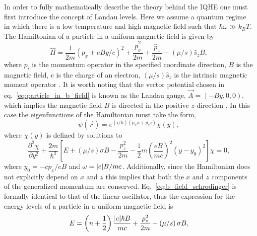\noindent In order to fully mathematically describe the theory behind the \acs{IQHE} one must first introduce the concept of Landau levels. Here we assume a quantum regime in which there is a low temperature and high magnetic field such that $\hbar\omega\gg k_B T$. The Hamiltonian of a particle in a uniform magnetic field is given by 
\begin{equation}\label{eq:particle_in_b_field}
\hat{H} = \frac{1}{2m}\left(\hat{p}_x+eBy/c\right)^2 + \frac{\hat{p}_y^2}{2m} + \frac{\hat{p}_z}{2m} - \left(\mu/s\right)\hat{s}_z B,
\end{equation}
where $\hat{p}_i$ is the momentum operator in the specified coordinate direction, $B$ is the magnetic field, $e$ is the charge of an electron, $\left(\mu/s\right)\hat{s}_z$ is the intrinsic magnetic moment operator \cite{Landau_Quantum1965}. It is worth noting that the vector potential chosen in eq.~\ref{eq:particle_in_b_field} is known as the Landau gauge, $\vec{A} = \left(-By, 0, 0\right)$, which implies the magnetic field $B$ is directed in the positive $z$-direction \cite{Sakurai_Quantum1994,Landau_Diagmagnetismus1930}. In this case the eigenfunctions of the Hamiltonian must take the form,
\begin{equation}\label{eq:psi_b_field}
\psi\left(\vec{r}\right) = e^{\left(i/\hbar\right)\left(p_x x+p_z z\right)}\chi\left(y\right),
\end{equation} 
where $\chi\left(y\right)$ is defined by solutions to  
\begin{equation}\label{eq:b_field_schrodinger}
	\frac{\partial^2 \chi}{\partial y^2} + \frac{2m}{\hbar^2}\left[E +\left(\mu/s\right)\sigma B - \frac{p_z^2}{2m}-\frac{1}{2}m\left(\frac{e B}{mc}\right)^2\left(y-y_0\right)^2\right]\chi = 0,
\end{equation}
where $y_0 =-c p_x/e B$ and $\omega = \abs{e}B/m c$. Additionally, since the Hamiltonian does not explicitly depend on $x$ and $z$ this implies that both the $x$ and $z$ components of the generalized momentum are conserved. Eq.~\ref{eq:b_field_schrodinger} is formally identical to that of the linear oscillator, thus the expression for the energy levels of a particle in a uniform magnetic field is 
\begin{equation}\label{eq:landau_levels_3D}
	E = \left(n+\frac{1}{2}\right)\frac{\abs{e}\hbar B}{mc} + \frac{p_z^2}{2m} - \left(\mu/s\right)\sigma B,
\end{equation}
